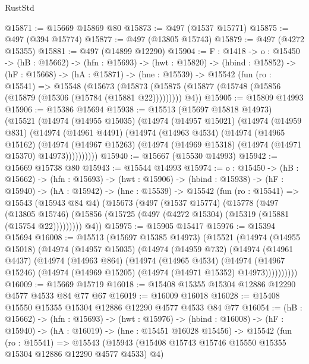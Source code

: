 \begin{lexlean}{RustStd}
\begin{coremodule}
@15871 := @15669 @15869 @80
@15873 := @497 (@1537 @15771)
@15875 := @497 (@394 @15774)
@15877 := @497 (@13805 @15743)
@15879 := @497 (@4272 @15355)
@15881 := @497 (@14899 @12290)
@15904 := {F : @1418} ->
  {o : @15450} ->
  (hB : @15662) ->
  (hfn : @15693) ->
  (hwt : @15820) ->
  (hbind : @15852) ->
  (hF : @15668) ->
  (hA : @15871) ->
  (hne : @15539) ->
  @15542
    (fun (ro : @15541) =>
    @15548
      (@15673
        (@15873 (@15875 (@15877 (@15748 (@15856 (@15879 (@15306 (@15784 (@15881 @22)))))))))
        @4))
@15905 := @15809 @14993
@15906 := @15386 @15694
@15938 := @15513
    (@15697 @15818 @14973)
    (@15521
      (@14974
        (@14955 @15035)
        (@14974
          (@14957 @15021)
          (@14974
            (@14959 @831)
            (@14974
              (@14961 @4491)
              (@14974
                (@14963 @4534)
                (@14974
                  (@14965 @15162)
                  (@14974
                    (@14967 @15263)
                    (@14974 (@14969 @15318) (@14974 (@14971 @15370) @14973))))))))))
@15940 := @15667 (@15530 @14993)
@15942 := @15669 @15738 @80
@15943 := @15544 @14993
@15974 := {o : @15450} ->
  (hB : @15662) ->
  (hfn : @15693) ->
  (hwt : @15906) ->
  (hbind : @15938) ->
  (hF : @15940) ->
  (hA : @15942) ->
  (hne : @15539) ->
  @15542
    (fun (ro : @15541) =>
    @15543
      (@15943 @84 @4)
      (@15673
        (@497
          (@1537 @15774)
          (@15778
            (@497
              (@13805 @15746)
              (@15856 (@15725 (@497 (@4272 @15304) (@15319 (@15881 (@15754 @22)))))))))
        @4))
@15975 := @15905 @15417
@15976 := @15394 @15694
@16008 := @15513
    (@15697 @15385 @14973)
    (@15521
      (@14974
        (@14955 @15018)
        (@14974
          (@14957 @15035)
          (@14974
            (@14959 @732)
            (@14974
              (@14961 @4437)
              (@14974
                (@14963 @864)
                (@14974
                  (@14965 @4534)
                  (@14974
                    (@14967 @15246)
                    (@14974 (@14969 @15205) (@14974 (@14971 @15352) @14973))))))))))
@16009 := @15669 @15719
@16018 := @15408 @15355 @15304 @12886 @12290 @4577 @4533 @84 @77 @67
@16019 := @16009 @16018
@16028 := @15408 @15550 @15355 @15304 @12886 @12290 @4577 @4533 @84 @77
@16054 := (hB : @15662) ->
  (hfn : @15693) ->
  (hwt : @15976) ->
  (hbind : @16008) ->
  (hF : @15940) ->
  (hA : @16019) ->
  (hne : @15451 @16028 @15456) ->
  @15542
    (fun (ro : @15541) =>
    @15543
      (@15943 (@15408 @15743 @15746 @15550 @15355 @15304 @12886 @12290 @4577 @4533) @4)

\end{coremodule}
\end{lexlean}

